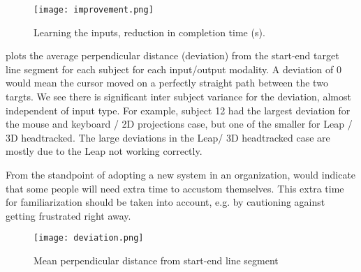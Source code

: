 \begin{figure}
    \centering
    \texttt{[image: improvement.png]}
    \caption{Learning the inputs, reduction in completion time (s).}
    \label{fig:improvementtimes}
\end{figure}

 plots the average perpendicular distance (deviation) from
the start-end target line segment for each subject for each input/output
modality.  A deviation of 0 would mean the cursor moved on a perfectly
straight path between the two targts.  We see there is significant inter
subject variance for the deviation, almost independent of input type.  For
example, subject 12 had the largest deviation for the mouse and keyboard / 2D
projections case, but one of the smaller for Leap / 3D headtracked.  The large
deviations in the Leap/ 3D headtracked case are mostly due to the Leap not
working correctly.

From the standpoint of adopting a new system in an organization,
 would indicate that some people will need extra time to
accustom themselves.  This extra time for familiarization should be taken into
account, e.g. by cautioning against getting frustrated right away.

\begin{figure}
  \centering
  \texttt{[image: deviation.png]}
  \caption{Mean perpendicular distance from start-end line segment}
  \label{fig:deviation}
\end{figure}

